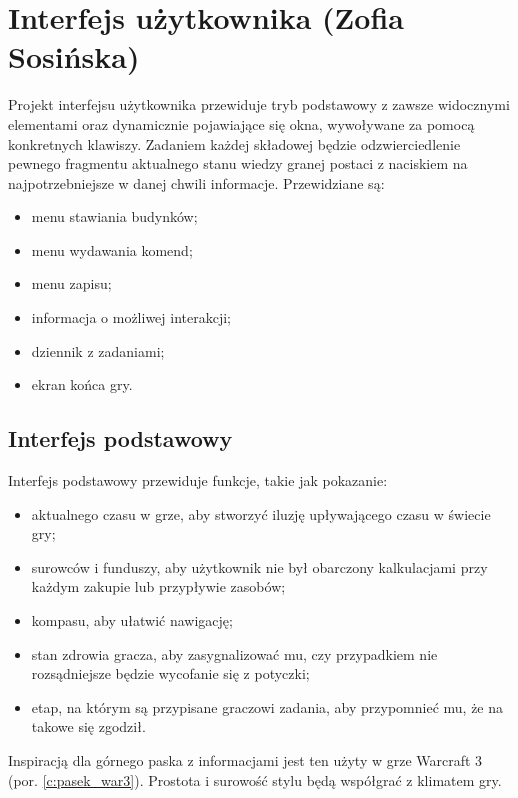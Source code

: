\section{Interfejs użytkownika (Zofia Sosińska)}\label{chap:ui}
Projekt interfejsu użytkownika przewiduje tryb podstawowy z zawsze widocznymi elementami oraz dynamicznie pojawiające się okna, wywoływane za pomocą konkretnych klawiszy. 
 Zadaniem każdej składowej będzie odzwierciedlenie pewnego fragmentu aktualnego stanu wiedzy granej postaci z naciskiem na najpotrzebniejsze w danej chwili informacje. Przewidziane są:
 \begin{itemize}
    \item menu stawiania budynków; 
    \item menu wydawania komend;
    \item menu zapisu;
    \item informacja o możliwej interakcji;
    \item dziennik z zadaniami;
    \item ekran końca gry.
\end{itemize}
	
\subsection{Interfejs podstawowy}
Interfejs podstawowy przewiduje funkcje, takie jak pokazanie:
\begin{itemize}
    \item aktualnego czasu w grze, aby stworzyć iluzję upływającego czasu w świecie gry; 
    \item surowców i funduszy, aby użytkownik nie był obarczony kalkulacjami przy każdym zakupie lub przypływie zasobów;
    \item kompasu, aby ułatwić nawigację;
    \item stan zdrowia gracza, aby zasygnalizować mu, czy przypadkiem nie rozsądniejsze będzie wycofanie się z potyczki;
    \item etap, na którym są przypisane graczowi zadania, aby przypomnieć mu, że na takowe się zgodził.
\end{itemize}
Inspiracją dla górnego paska z informacjami jest ten użyty w grze Warcraft 3 (por. \ref{c:pasek_war3}). Prostota i surowość stylu będą współgrać z klimatem gry.

